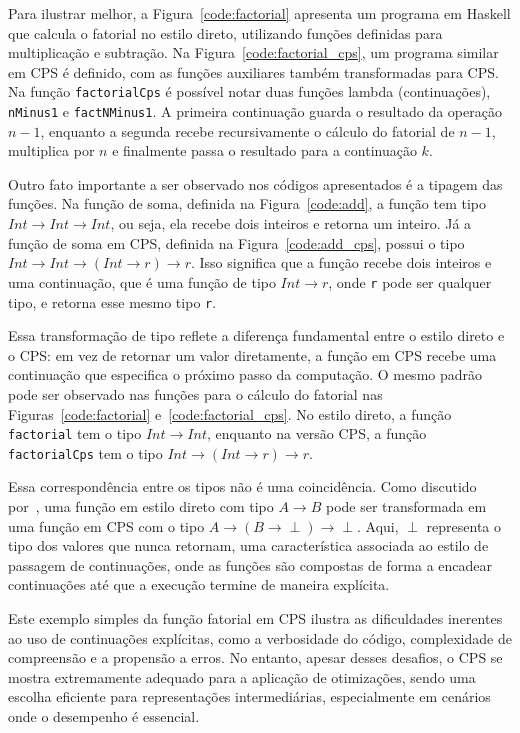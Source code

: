 



Para ilustrar melhor, a Figura~\ref{code:factorial} apresenta um programa em Haskell que calcula o fatorial no estilo direto, utilizando funções definidas para multiplicação e subtração.
Na Figura~\ref{code:factorial_cps}, um programa similar em CPS é definido, com as funções auxiliares também transformadas para CPS\@.
Na função \texttt{factorialCps} é possível notar duas funções lambda (continuações), \texttt{nMinus1} e \texttt{factNMinus1}.
A primeira continuação guarda o resultado da operação $n - 1$, enquanto a segunda recebe recursivamente o cálculo do fatorial de $n - 1$, multiplica por $n$ e finalmente passa o resultado para a continuação $k$.

Outro fato importante a ser observado nos códigos apresentados é a tipagem das funções.
Na função de soma, definida na Figura~\ref{code:add}, a função tem tipo $Int \rightarrow Int \rightarrow Int$, ou seja, ela recebe dois inteiros e retorna um inteiro.
Já a função de soma em CPS, definida na Figura~\ref{code:add_cps}, possui o tipo $Int \rightarrow Int \rightarrow (Int \rightarrow r) \rightarrow r$. Isso significa que a função recebe dois inteiros e uma continuação, que é uma função de tipo $Int \rightarrow r$, onde \texttt{r} pode ser qualquer tipo, e retorna esse mesmo tipo \texttt{r}.

Essa transformação de tipo reflete a diferença fundamental entre o estilo direto e o CPS\@: em vez de retornar um valor diretamente, a função em CPS recebe uma continuação que especifica o próximo passo da computação.
O mesmo padrão pode ser observado nas funções para o cálculo do fatorial nas Figuras~\ref{code:factorial} e~\ref{code:factorial_cps}.
No estilo direto, a função \texttt{factorial} tem o tipo $Int \rightarrow Int$, enquanto na versão CPS, a função \texttt{factorialCps} tem o tipo $Int \rightarrow (Int \rightarrow r) \rightarrow r$.

Essa correspondência entre os tipos não é uma coincidência.
Como discutido por~\cite{torrens2019calculo}, uma função em estilo direto com tipo $A \rightarrow B$ pode ser transformada em uma função em CPS com o tipo $A \rightarrow (B \rightarrow \perp) \rightarrow \perp$.
Aqui, $\perp$ representa o tipo dos valores que nunca retornam, uma característica associada ao estilo de passagem de continuações, onde as funções são compostas de forma a encadear continuações até que a execução termine de maneira explícita.

Este exemplo simples da função fatorial em CPS ilustra as dificuldades inerentes ao uso de continuações explícitas, como a verbosidade do código, complexidade de compreensão e a propensão a erros.
No entanto, apesar desses desafios, o CPS se mostra extremamente adequado para a aplicação de otimizações, sendo uma escolha eficiente para representações intermediárias, especialmente em cenários onde o desempenho é essencial.
